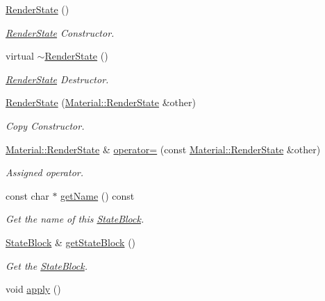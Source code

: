 \begin{DoxyCompactItemize}
\item 
\hyperlink{class_i_dream_sky_1_1_material_1_1_render_state_aa126cdbda51ef9acb21df028a47ce1cc}{Render\+State} ()
\begin{DoxyCompactList}\small\item\em \hyperlink{class_i_dream_sky_1_1_material_1_1_render_state}{Render\+State} Constructor. \end{DoxyCompactList}\item 
virtual \hyperlink{class_i_dream_sky_1_1_material_1_1_render_state_ab7e62c5274ce7ff5cc54e4d1fc3469ce}{$\sim$\+Render\+State} ()
\begin{DoxyCompactList}\small\item\em \hyperlink{class_i_dream_sky_1_1_material_1_1_render_state}{Render\+State} Destructor. \end{DoxyCompactList}\item 
\hyperlink{class_i_dream_sky_1_1_material_1_1_render_state_ad18a28528f048e41e096b2d004811bd6}{Render\+State} (\hyperlink{class_i_dream_sky_1_1_material_1_1_render_state}{Material\+::\+Render\+State} \&other)
\begin{DoxyCompactList}\small\item\em Copy Constructor. \end{DoxyCompactList}\item 
\hyperlink{class_i_dream_sky_1_1_material_1_1_render_state}{Material\+::\+Render\+State} \& \hyperlink{class_i_dream_sky_1_1_material_1_1_render_state_afdca490ba7eebcc44bf86955ef9c92b1}{operator=} (const \hyperlink{class_i_dream_sky_1_1_material_1_1_render_state}{Material\+::\+Render\+State} \&other)
\begin{DoxyCompactList}\small\item\em Assigned operator. \end{DoxyCompactList}\item 
const char $\ast$ \hyperlink{class_i_dream_sky_1_1_material_1_1_render_state_ac969002d5e23b21c7ff2aeff1dd04332}{get\+Name} () const 
\begin{DoxyCompactList}\small\item\em Get the name of this \hyperlink{class_i_dream_sky_1_1_material_1_1_state_block}{State\+Block}. \end{DoxyCompactList}\item 
\hyperlink{class_i_dream_sky_1_1_material_1_1_state_block}{State\+Block} \& \hyperlink{class_i_dream_sky_1_1_material_1_1_render_state_a4341091e54f0d2e4aaa3425687676870}{get\+State\+Block} ()
\begin{DoxyCompactList}\small\item\em Get the \hyperlink{class_i_dream_sky_1_1_material_1_1_state_block}{State\+Block}. \end{DoxyCompactList}\item 
void \hyperlink{class_i_dream_sky_1_1_material_1_1_render_state_a7ca4bac252c3adc321b543b732db71f7}{apply} ()\hypertarget{class_i_dream_sky_1_1_material_1_1_render_state_a7ca4bac252c3adc321b543b732db71f7}{}\label{class_i_dream_sky_1_1_material_1_1_render_state_a7ca4bac252c3adc321b543b732db71f7}


\end{DoxyCompactItemize}
